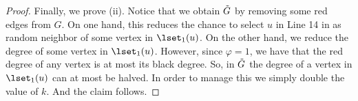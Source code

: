 \begin{proof}
Finally, we prove (ii). Notice that we obtain $\Tilde{G}$ by removing some red edges from $G$. On one hand, this reduces the chance to select $u$ in Line 14 in  as random neighbor of some vertex in $\lset_1(u)$. On the other hand, we reduce the degree of some vertex in $\lset_1(u)$. However, since $\varphi=1$, we have that the red degree of any vertex is at most its black degree. So, in $\Tilde{G}$ the degree of a vertex in $\lset_1(u)$ can at most be halved. In order to manage this we simply double the value of $k$. And the claim follows.
\end{proof}



